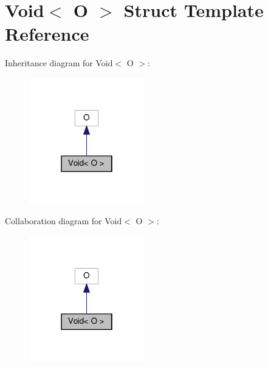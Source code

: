 \hypertarget{structVoid}{}\section{Void$<$ O $>$ Struct Template Reference}
\label{structVoid}


Inheritance diagram for Void$<$ O $>$\+:\nopagebreak
\begin{figure}[H]
\begin{center}
\leavevmode
\includegraphics[width=142pt]{structVoid__inherit__graph}
\end{center}
\end{figure}


Collaboration diagram for Void$<$ O $>$\+:\nopagebreak
\begin{figure}[H]
\begin{center}
\leavevmode
\includegraphics[width=142pt]{structVoid__coll__graph}
\end{center}
\end{figure}
